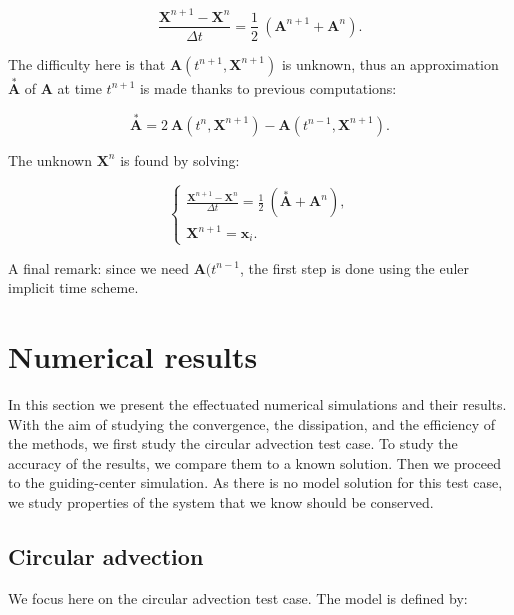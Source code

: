 \documentclass[proc]{edpsmath}
\begin{document}
 \begin{equation*}
 	 \displaystyle{ \frac{\textbf{X}^{n+1}-\textbf{X}^{n}}{ \Delta t } =\frac{1}{2} ~( \textbf{A}^{n+1}+\textbf{A}^{n} ) }.
 \end{equation*} 
 
\noindent The difficulty here is that  $\textbf{A}(t^{n+1},\textbf{X}^{n+1})$ is unknown, thus an approximation $\overset{*}{\textbf{A}}$ of    $\textbf{A}$ at time $t^{n+1}$ is made thanks to previous computations:
 
 \begin{equation*}
\overset{*}{\textbf{A}}= 2~\textbf{A}(t^{n},\textbf{X}^{n+1}) -  \textbf{A}(t^{n-1},\textbf{X}^{n+1}).
 \end{equation*} 
 
\noindent The unknown $\textbf{X}^{n}$ is found by solving:
 
 
 \begin{equation*}
 	\begin{cases}
 	 \displaystyle{ \frac{\textbf{X}^{n+1}-\textbf{X}^{n}}{ \Delta t } =\frac{1}{2} ~(\overset{*}{\textbf{A}}+\textbf{A}^{n} ) },\\[3.5mm]
 	 \textbf{X}^{n+1}=\textbf{x}_i .
 	\end{cases}
 \end{equation*} 
 
A final remark: since we need $\textbf{A}(t^{n-1}$, the first step is done using the euler implicit time scheme. 
 
\section{Numerical results}
\label{sec:results}
In this section we present the effectuated numerical simulations and their results. With the aim of studying the convergence, the dissipation, and the  efficiency of the methods, we first study the circular advection test case. To study the accuracy of the results, we compare them to a known solution. Then we proceed to the guiding-center simulation. As there is no model solution for this test case, we study properties of the system that we know should be conserved.


\subsection{Circular advection}

We focus here on the circular advection test case. The model is defined by:
\end{document}
